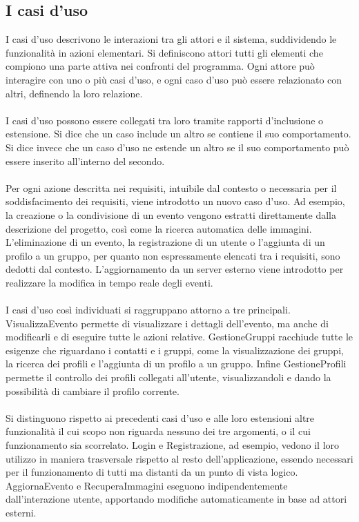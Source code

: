 \subsection{I casi d’uso}

I casi d’uso descrivono le interazioni tra gli attori e il sistema,
suddividendo le funzionalità in azioni elementari.
Si definiscono attori tutti gli elementi che compiono una parte attiva nei confronti del programma.
Ogni attore può interagire con uno o più casi d'uso,
e ogni caso d'uso può essere relazionato con altri, definendo la loro relazione.\\
\\
I casi d'uso possono essere collegati tra loro tramite rapporti d'inclusione o estensione.
Si dice che un caso include un altro se contiene il suo comportamento.
Si dice invece che un caso d'uso ne estende un altro se
il suo comportamento può essere inserito all'interno del secondo.\\
\\
Per ogni azione descritta nei requisiti, intuibile dal contesto o necessaria per il soddisfacimento dei requisiti,
viene introdotto un nuovo caso d'uso.
Ad esempio, la creazione o la condivisione di un evento
vengono estratti direttamente dalla descrizione del progetto,
così come la ricerca automatica delle immagini.
L'eliminazione di un evento, la registrazione di un utente o l'aggiunta di un profilo a un gruppo,
per quanto non espressamente elencati tra i requisiti,
sono dedotti dal contesto.
L'aggiornamento da un server esterno viene introdotto
per realizzare la modifica in tempo reale degli eventi.\\
\\
I casi d'uso così individuati si raggruppano attorno a tre principali.
VisualizzaEvento permette di visualizzare i dettagli dell'evento,
ma anche di modificarli e di eseguire tutte le azioni relative.
GestioneGruppi racchiude tutte le esigenze che riguardano i contatti e i gruppi,
come la visualizzazione dei gruppi, la ricerca dei profili e l'aggiunta di un profilo a un gruppo.
Infine GestioneProfili permette il controllo dei profili collegati all'utente,
visualizzandoli e dando la possibilità di cambiare il profilo corrente.\\
\\
Si distinguono rispetto ai precedenti casi d'uso e alle loro estensioni
altre funzionalità il cui scopo non riguarda nessuno dei tre argomenti,
o il cui funzionamento sia scorrelato.
Login e Registrazione, ad esempio,
vedono il loro utilizzo in maniera trasversale rispetto al resto dell'applicazione,
essendo necessari per il funzionamento di tutti ma distanti da un punto di vista logico.
AggiornaEvento e RecuperaImmagini eseguono indipendentemente dall'interazione utente,
apportando modifiche automaticamente in base ad attori esterni.\\

